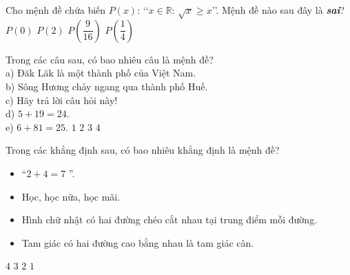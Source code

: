 \begin{ex}%
	Cho mệnh đề chứa biến $P(x)$: \lq\lq$x\in \mathbb{R}:\, \sqrt{x}\geq x$\rq\rq.  Mệnh đề nào sau đây là \textbf{\textit{sai}}?
	\choice 
		{$P(0)$} 
		{\True $P(2)$} 
		 {$P\left(\dfrac{9}{16}\right)$}
		{$P\left(\dfrac{1}{4}\right)$} 
\end{ex}

\begin{ex}%
	Trong các câu sau,  có bao nhiêu câu là mệnh đề?\\
	a) Đăk Lăk là  một thành phố của Việt Nam.\\
	b) Sông Hương chảy ngang qua  thành phố Huế.\\
	c) Hãy trả lời câu  hỏi này!\\
	d) $5+19=24$.\\ 
	e)  $6+81=25$.
	 \choice
		 { $1$}
		 { $2$}
		 { $3$}
		{ \True  $4$}
\end{ex}

\begin{ex}%
	Trong các khẳng  định sau, có bao nhiêu khẳng định là mệnh đề?
	\begin{itemize}
		\item  “$2+4=7$ ”.
		\item Học, học nữa, học mãi. 
		\item Hình chữ nhật  có hai đường chéo cắt nhau tại trung điểm mỗi đường.
		\item Tam giác có hai đường cao bằng  nhau là tam giác cân.
	\end{itemize}
	 \choice
		 {$4$}
		{\True $3$} 
		{$2$} 
		{$1$} 
\end{ex}

